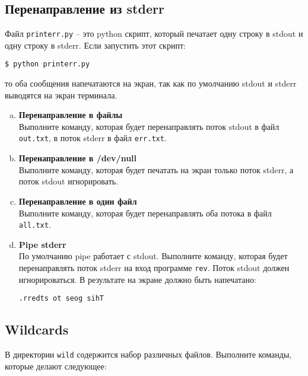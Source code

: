 \documentclass{article}
\begin{document}
\subsection{Перенаправление из stderr}
Файл \texttt{printerr.py} -- это python скрипт, который печатает одну строку в stdout и одну строку в stderr. Если запустить этот скрипт:
\begin{lstlisting}
$ python printerr.py
\end{lstlisting}
то оба сообщения напечатаются на экран, так как по умолчанию stdout и stderr выводятся на экран терминала.
\begin{enumerate}[a.]
\item \textbf{Перенаправление в файлы}\\
Выполните команду, которая будет перенаправлять поток stdout в файл \texttt{out.txt}, в поток stderr в файл \texttt{err.txt}.

\item \textbf{Перенаправление в /dev/null}\\
Выполните команду, которая будет печатать на экран только поток stderr, а поток stdout игнорировать.

\item \textbf{Перенаправление в один файл}\\
Выполните команду, которая будет перенаправлять оба потока в файл \texttt{all.txt}.

\item \textbf{Pipe stderr}\\
По умолчанию pipe работает с stdout.
Выполните команду, которая будет перенаправлять поток stderr на вход программе \texttt{rev}. Поток stdout должен игнорироваться. В результате на экране должно быть напечатано:
\begin{lstlisting}
.rredts ot seog sihT
\end{lstlisting}
\end{enumerate}

\subsection{Wildcards}
В директории \texttt{wild} содержится набор различных файлов. Выполните команды, которые делают следующее:
\end{document}

